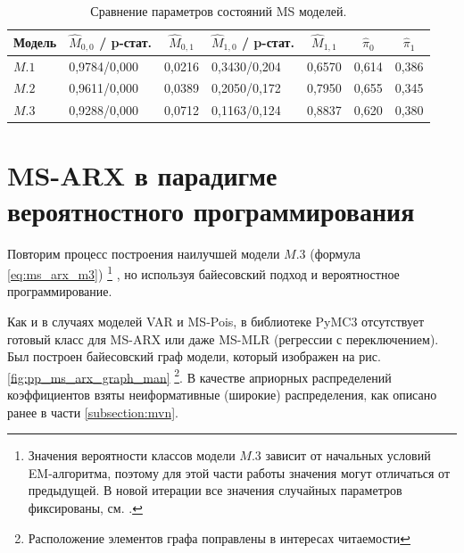 \documentclass[a4paper,14pt]{extreport}
\begin{document}
\begin{table}[H]
	\begin{tabular}{l|ll|ll|ll}
		\hline
		\multicolumn{1}{c|}{\textbf{Модель}} & \multicolumn{1}{c}{$\hat{M}_{0,0}$ / p-стат.} & \multicolumn{1}{c|}{$\hat{M}_{0,1}$} & \multicolumn{1}{c}{$\hat{M}_{1,0}$ / p-стат.} & \multicolumn{1}{c|}{$\hat{M}_{1,1}$} & \multicolumn{1}{c}{$\hat{\pi}_0$} & \multicolumn{1}{c}{$\hat{\pi}_1$} \\ \hline
		$M.1$                                & 0,9784/0,000                                  & 0,0216                               & 0,3430/0,204                                  & 0,6570                               & 0,614                             & 0,386                             \\
		$M.2$                                & 0,9611/0,000                                  & 0,0389                               & 0,2050/0,172                                  & 0,7950                               & 0,655                             & 0,345                             \\
		$M.3$                                & 0,9288/0,000                                  & 0,0712                               & 0,1163/0,124                                  & 0,8837                               & 0,620                             & 0,380                             \\ \hline
	\end{tabular}
	\caption{Сравнение параметров состояний MS моделей. }
	\label{tbl:ggdp_model_params_ms}
\end{table}


\section{MS-ARX в парадигме вероятностного программирования}

\label{section:msarx_pp}

Повторим процесс построения наилучшей модели $M.3$ (формула \eqref{eq:ms_arx_m3}) 
\footnote{Значения вероятности классов модели $M.3$ зависит от начальных условий EM-алгоритма, поэтому для этой части работы значения могут отличаться от предыдущей. В новой итерации все значения случайных параметров фиксированы, см. . }
, но используя байесовский подход и вероятностное программирование. 

Как и в случаях моделей VAR и MS-Pois, в библиотеке PyMC3 отсутствует готовый класс для MS-ARX или даже MS-MLR (регрессии с переключением). Был построен байесовский граф модели, который изображен на рис. \ref{fig:pp_ms_arx_graph_man} \footnote{Расположение элементов графа поправлены в интересах читаемости}. В качестве априорных распределений коэффициентов взяты неиформативные (широкие) распределения, как описано ранее в части \ref{subsection:mvn}.
\end{document}
